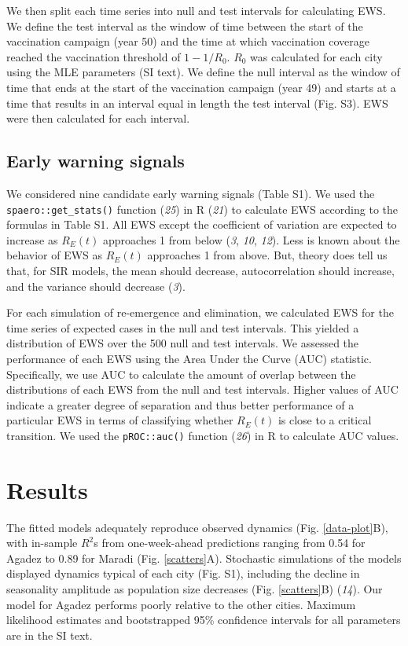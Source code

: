 \documentclass[3p]{elsarticle} %
\begin{document}
We then split each time series into null and test intervals for
calculating EWS. We define the test interval as the window of time
between the start of the vaccination campaign (year 50) and the time at
which vaccination coverage reached the vaccination threshold of
\(1 - 1/R_0\). \(R_0\) was calculated for each city using the MLE
parameters (SI text). We define the null interval as the window of time
that ends at the start of the vaccination campaign (year 49) and starts
at a time that results in an interval equal in length the test interval
(Fig. S3). EWS were then calculated for each interval.

\hypertarget{early-warning-signals}{%
\subsection{Early warning signals}\label{early-warning-signals}}

We considered nine candidate early warning signals (Table S1). We used
the \texttt{spaero::get\_stats()} function (\emph{25}) in R (\emph{21})
to calculate EWS according to the formulas in Table S1. All EWS except
the coefficient of variation are expected to increase as \(R_E(t)\)
approaches 1 from below (\emph{3}, \emph{10}, \emph{12}). Less is known
about the behavior of EWS as \(R_E(t)\) approaches 1 from above. But,
theory does tell us that, for SIR models, the mean should decrease,
autocorrelation should increase, and the variance should decrease
(\emph{3}).

For each simulation of re-emergence and elimination, we calculated EWS
for the time series of expected cases in the null and test intervals.
This yielded a distribution of EWS over the 500 null and test intervals.
We assessed the performance of each EWS using the Area Under the Curve
(AUC) statistic. Specifically, we use AUC to calculate the amount of
overlap between the distributions of each EWS from the null and test
intervals. Higher values of AUC indicate a greater degree of separation
and thus better performance of a particular EWS in terms of classifying
whether \(R_E(t)\) is close to a critical transition. We used the
\texttt{pROC::auc()} function (\emph{26}) in R to calculate AUC values.

\hypertarget{results}{%
\section{Results}\label{results}}

The fitted models adequately reproduce observed dynamics (Fig.
\ref{data-plot}B), with in-sample \(R^2\)s from one-week-ahead
predictions ranging from 0.54 for Agadez to 0.89 for Maradi (Fig.
\ref{scatters}A). Stochastic simulations of the models displayed
dynamics typical of each city (Fig. S1), including the decline in
seasonality amplitude as population size decreases (Fig.
\ref{scatters}B) (\emph{14}). Our model for Agadez performs poorly
relative to the other cities. Maximum likelihood estimates and
bootstrapped 95\% confidence intervals for all parameters are in the SI
text.
\end{document}
